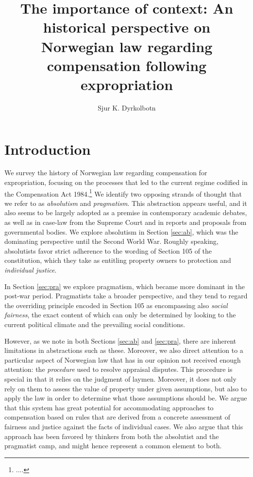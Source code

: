 \documentclass[10pt]{article} %
\title{The importance of context: An historical perspective on Norwegian law regarding compensation following expropriation}
\author{Sjur K. Dyrkolbotn}
\begin{document}
\maketitle

\section{Introduction}\label{intro}

We survey the history of Norwegian law regarding compensation for expropriation, focusing on the processes that led to the current regime codified in the Compensation Act 1984.\footnote{....} We identify two opposing strands of thought that we refer to as \emph{absolutism} and \emph{pragmatism}. This abstraction appears useful, and it also seems to be largely adopted as a premise in contemporary academic debates, as well as in case-law from the Supreme Court and in reports and proposals from governmental bodies. We explore absolutism in Section \ref{sec:ab}, which was the dominating perspective until the Second World War. Roughly speaking, absolutists favor strict adherence to the wording of Section 105 of the constitution, which they take as entitling property owners to protection and \emph{individual justice}.  

In Section \ref{sec:pra} we explore pragmatism, which became more dominant in the post-war period. Pragmatists take a broader perspective, and they tend to regard the overriding principle encoded in Section 105 as encompassing also \emph{social fairness}, the exact content of which can only be determined by looking to the current political climate and the prevailing social conditions.

However, as we note in both Sections \ref{sec:ab} and \ref{sec:pra}, there are inherent limitations in abstractions such as these. Moreover, we also direct attention to a particular aspect of Norwegian law that has in our opinion not received enough attention: the \emph{procedure} used to resolve appraisal disputes. This procedure is special in that it relies on the judgment of laymen. Moreover, it does not only rely on them to assess the value of property under given assumptions, but also to apply the law in order to determine what those assumptions should be. We argue that  this system has great potential for accommodating approaches to compensation based on rules that are derived from a concrete assessment of fairness and justice against the facts of individual cases. We also argue that this approach has been favored by thinkers from both the absolutist and the pragmatist camp, and might hence represent a common element to both.
\end{document}
